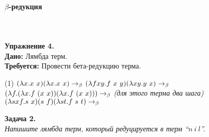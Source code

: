 \documentclass[lambda.tex]{subfiles}
\begin{document}
\paragraph{$\beta$-редукция}~\\\\
\textbf{Упражнение 4.}\\
\textbf{Дано:} Лямбда терм.\\
\textbf{Требуется:} Провести бета-редукцию терма.
\begin{tasks}(1)
	\task $(\lambda x.x\ x)(\lambda x.x\ x)\rb$
	\task $(\lambda fxy.f\ x\ y)(\lambda xy.y\ x)\rightarrow_\beta$
	\task $(\lambda f.(\lambda x.f\ (x\ x)) (\lambda x.f\ (x\ x)))\rb$ \emph{(для этого терма два шага)}
	\task $(\lambda sxf.s\ x)(s\ f)(\lambda st.f\ s\ t)\rightarrow_\beta$
\end{tasks}
\textbf{Задача 2.}~\\
\emph{Напишите лямбда терм, который редуцируется в терм ``$n\ i\ l$''.}
\end{document}
